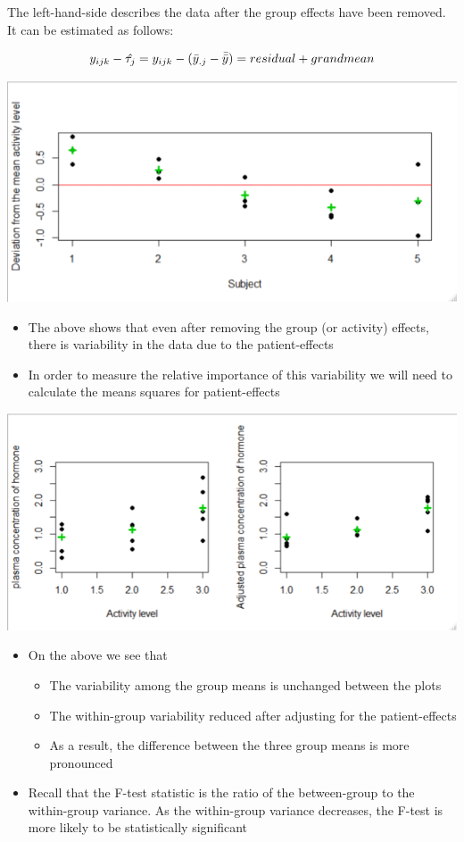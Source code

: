 \documentclass[
]{book}
\providecommand{\tightlist}{%
  \setlength{\itemsep}{0pt}\setlength{\parskip}{0pt}}
\begin{document}
The left-hand-side describes the data after the group effects have been removed. It can be estimated as follows:

\[y_{ijk}-\hat{\tau_j}=y_{ijk}-(\bar y_{.j}-\bar{\bar y})=residual+grand\space mean\]

\includegraphics[width=0.6\linewidth]{./11_12}

\begin{itemize}
\tightlist
\item
  The above shows that even after removing the group (or activity) effects, there is variability in the data due to the patient-effects
\item
  In order to measure the relative importance of this variability we will need to calculate the means squares for patient-effects
\end{itemize}

\includegraphics[width=0.6\linewidth]{./11_14}

\begin{itemize}
\tightlist
\item
  On the above we see that

  \begin{itemize}
  \tightlist
  \item
    The variability among the group means is unchanged between the plots
  \item
    The within-group variability reduced after adjusting for the patient-effects
  \item
    As a result, the difference between the three group means is more pronounced
  \end{itemize}
\item
  Recall that the F-test statistic is the ratio of the between-group to the within-group variance. As the within-group variance decreases, the F-test is more likely to be statistically significant
\end{itemize}
\end{document}
